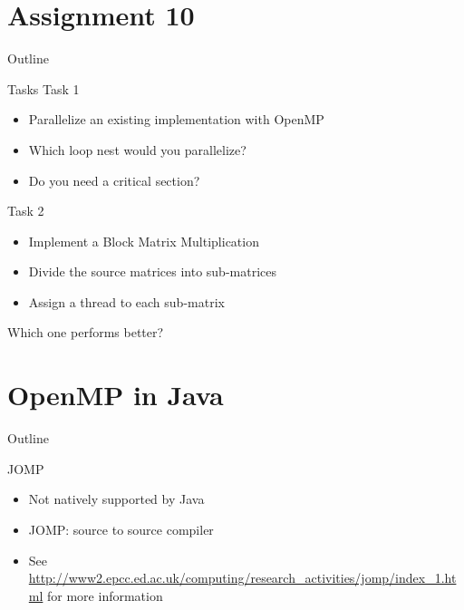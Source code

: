 \section{Assignment 10}

\begin{frame}{Outline}
  \tableofcontents[current]
\end{frame}

\begin{frame}{Tasks}
  Task 1
  \begin{itemize}
  \item Parallelize an existing implementation with OpenMP
  \item Which loop nest would you parallelize?
  \item Do you need a critical section?
  \end{itemize}


  Task 2
  \begin{itemize}
  \item Implement a Block Matrix Multiplication
  \item Divide the source matrices into sub-matrices
  \item Assign a thread to each sub-matrix
  \end{itemize}


  Which one performs better?
\end{frame}


\section{OpenMP in Java}

\begin{frame}{Outline}
  \tableofcontents[current]
\end{frame}

\begin{frame}{JOMP}
  \begin{itemize}
  \item Not natively supported by Java
  \item JOMP: source to source compiler
  \item See
    \url{http://www2.epcc.ed.ac.uk/computing/research_activities/jomp/index_1.html} 
    for more information
  \end{itemize}
\end{frame}

